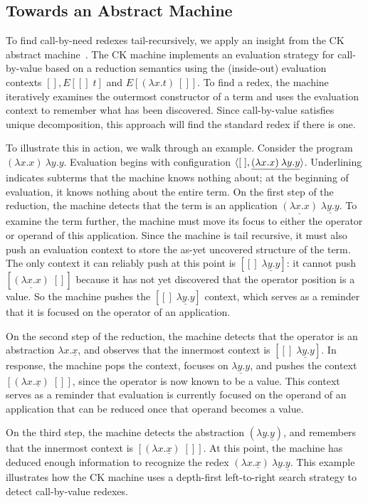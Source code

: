 \documentclass{LMCS}
\theoremstyle{plain}
\theoremstyle{remark}
\begin{document}
\subsection{Towards an Abstract Machine}


To find call-by-need redexes tail-recursively, we apply an insight from
the CK abstract machine~\cite{felleisen86secd,findler09redex}.
The CK machine implements an evaluation strategy for call-by-value based on a
reduction semantics using the (inside-out) evaluation contexts $[], E[[]\;t]$
and $E[(\lambda x.t)\:[]]$.  To find a redex, the machine iteratively
examines the outermost constructor of a term and uses the evaluation context to
remember what has been discovered.  Since call-by-value satisfies unique
decomposition, this approach will find the standard redex if there is one.

To illustrate this in action, we walk through an example.  Consider the program
$(\lambda x.x)\:\lambda y.y$.  Evaluation begins with configuration
$\braket{[\;], \underline{(\lambda x.x)\:\lambda y.y}}$.  Underlining
indicates subterms that the machine knows nothing about;  at the beginning of
evaluation, it knows nothing about the entire term.  On
the first step of the reduction, the machine detects that the term is an
application $\underline{(\lambda x.x)}\;\underline{\lambda y.y}$. 
To examine the term further, the machine must move its focus to either the
operator or operand of this application. Since the machine is tail recursive,
it must also push an evaluation context to store the as-yet uncovered structure
of the term.  The only context it can reliably push at this point is
$[[]\;\underline{\lambda y.y}]$: it cannot push
$[\underline{(\lambda x.x)}\;[]]$ because it has not yet discovered that the
operator position is a value.  So the machine pushes the
$[[]\;\underline{\lambda y.y}]$ context, which serves as a reminder that it is
focused on the operator of an application.

On the second step of the reduction, the machine detects that the operator is
an abstraction $\lambda x.\underline{x}$, and observes that the innermost
context is $[[]\;\underline{\lambda y.y}]$.  In response, the machine pops the
context, focuses on $\underline{\lambda y.y}$, and pushes the context
$[(\lambda x.\underline{x})\;[]]$, since the operator is now known to be a
value.  This context serves as a reminder that evaluation is currently
focused on the operand of an application that can be reduced once that operand
becomes a value.

On the third step, the machine detects the abstraction 
$(\lambda y.\underline{y})$, and remembers that the innermost context is
$[(\lambda x.\underline{x})\;[]]$.  At this point, the machine has deduced
enough information to recognize the redex
$(\lambda x.\underline{x})\:\lambda y.\underline{y}$.
This example illustrates how the CK machine uses a depth-first left-to-right
search strategy to detect call-by-value redexes.
\end{document}
